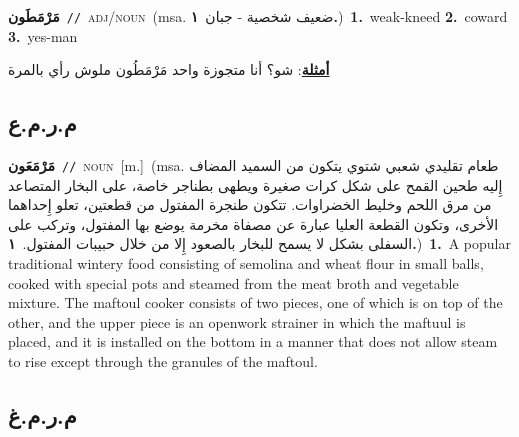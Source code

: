 \documentclass[10pt,a4paper,twoside]{article} %
\begin{document}
\begin{multicols}{2}
{\setlength\topsep{0pt}\textbf{\foreignlanguage{arabic}{مَرْمَطَون}}\ {\color{gray}\texttt{//}\color{black}}\ \textsc{adj/noun}\ \color{gray}(msa. \foreignlanguage{arabic}{ضعيف شخصية - جبان}~\foreignlanguage{arabic}{\textbf{١.}})\color{black}\ \textbf{1.}~weak-kneed  \textbf{2.}~coward  \textbf{3.}~yes-man\  \begin{flushright}\color{gray}\foreignlanguage{arabic}{\textbf{\underline{\foreignlanguage{arabic}{أمثلة}}}: شو؟ أنا متجوزة واحد مَرْمَطُون ملوش رأي بالمرة}\end{flushright}\color{black}} \vspace{2mm}

\vspace{-3mm}
\subsection*{\color{blue}\foreignlanguage{arabic}{م.ر.م.ع}\color{blue}{}} 

{\setlength\topsep{0pt}\textbf{\foreignlanguage{arabic}{مَرْمَعَون}}\ {\color{gray}\texttt{//}\color{black}}\ \textsc{noun}\ [m.]\ \color{gray}(msa. \foreignlanguage{arabic}{طعام تقليدي شعبي شتوي يتكون من السميد المضاف إِليه طحين القمح على شكل كرات صغيرة ويطهى بطناجر خاصة، على البخار المتصاعد من مرق اللحم وخليط الخضراوات. تتكون طنجرة المفتول من قطعتين، تعلو إِحداهما الأخرى، وتكون القطعة العليا عبارة عن مصفاة مخرمة يوضع بها المفتول، وتركب على السفلى بشكل لا يسمح للبخار بالصعود إِلا من خلال حبيبات المفتول.}~\foreignlanguage{arabic}{\textbf{١.}})\color{black}\ \textbf{1.}~A popular traditional wintery food consisting of semolina and wheat flour in small balls, cooked with special pots and steamed from the meat broth and vegetable mixture. The maftoul cooker consists of two pieces, one of which is on top of the other, and the upper piece is an openwork strainer in which the maftuul is placed, and it is installed on the bottom in a manner that does not allow steam to rise except through the granules of the maftoul.\ } \vspace{2mm}

\vspace{-3mm}
\subsection*{\color{blue}\foreignlanguage{arabic}{م.ر.م.غ}\color{blue}{}} 


\end{multicols}
\end{document}
